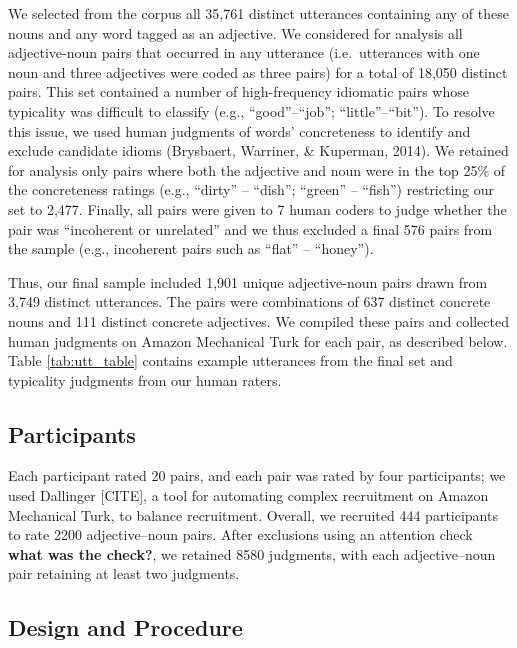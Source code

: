 \documentclass[10pt, letterpaper]{article}
\begin{document}
We selected from the corpus all 35,761 distinct utterances containing
any of these nouns and any word tagged as an adjective. We considered
for analysis all adjective-noun pairs that occurred in any utterance
(i.e.~utterances with one noun and three adjectives were coded as three
pairs) for a total of 18,050 distinct pairs. This set contained a number
of high-frequency idiomatic pairs whose typicality was difficult to
classify (e.g., ``good''--``job''; ``little''--``bit''). To resolve this
issue, we used human judgments of words' concreteness to identify and
exclude candidate idioms (Brysbaert, Warriner, \& Kuperman, 2014). We
retained for analysis only pairs where both the adjective and noun were
in the top 25\% of the concreteness ratings (e.g., ``dirty'' --
``dish''; ``green'' -- ``fish'') restricting our set to 2,477. Finally,
all pairs were given to 7 human coders to judge whether the pair was
``incoherent or unrelated'' and we thus excluded a final 576 pairs from
the sample (e.g., incoherent pairs such as ``flat'' -- ``honey'').

Thus, our final sample included 1,901 unique adjective-noun pairs drawn
from 3,749 distinct utterances. The pairs were combinations of 637
distinct concrete nouns and 111 distinct concrete adjectives. We
compiled these pairs and collected human judgments on Amazon Mechanical
Turk for each pair, as described below. Table \ref{tab:utt_table}
contains example utterances from the final set and typicality judgments
from our human raters.

\hypertarget{participants}{%
\subsection{Participants}\label{participants}}

Each participant rated 20 pairs, and each pair was rated by four
participants; we used Dallinger {[}CITE{]}, a tool for automating
complex recruitment on Amazon Mechanical Turk, to balance recruitment.
Overall, we recruited 444 participants to rate 2200 adjective--noun
pairs. After exclusions using an attention check \textbf{what was the
check?}, we retained 8580 judgments, with each adjective--noun pair
retaining at least two judgments.

\hypertarget{design-and-procedure}{%
\subsection{Design and Procedure}\label{design-and-procedure}}
\end{document}
